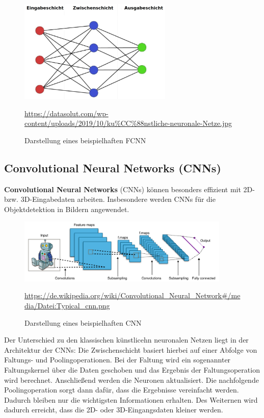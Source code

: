 	\begin{figure}[H]
		\centering
		\includegraphics[width=0.65\textwidth]{kapitel3/images/Simples_Neuronales_Netz.jpg}
		\caption{Darstellung eines beispielhaften FCNN}
		\vspace{0.2cm}
		\quelle\url{https://datasolut.com/wp-content/uploads/2019/10/ku%CC%88nstliche-neuronale-Netze.jpg}
	\end{figure}

\subsection{Convolutional Neural Networks (CNNs)}

	\textbf{Convolutional Neural Networks} (CNNs) können besonders effizient mit 2D- bzw. 3D-Eingabedaten arbeiten. Insbesondere werden CNNs für die Objektdetektion in Bildern angewendet. \cite{datasolut4} \\
	
	\begin{figure}[H]
		\centering
		\includegraphics[width=0.9\textwidth]{kapitel3/images/cnn.png}
		\caption{Darstellung eines beispielhaften CNN}
		\vspace{0.2cm}
		\quelle\url{https://de.wikipedia.org/wiki/Convolutional_Neural_Network#/media/Datei:Typical_cnn.png}
	\end{figure}
	
	Der Unterschied zu den klassischen künstlicehn neuronalen Netzen liegt in der Architektur der CNNs: Die Zwischenschicht basiert hierbei auf einer Abfolge von Faltungs- und Poolingoperationen. Bei der Faltung wird ein sogenannter Faltungskernel über die Daten geschoben und das Ergebnis der Faltungsoperation wird berechnet. Anschließend werden die Neuronen aktualisiert. Die nachfolgende Poolingoperation sorgt dann dafür, dass die Ergebnisse vereinfacht werden. Dadurch bleiben nur die wichtigsten Informationen erhalten.	Des Weiternen wird dadurch erreicht, dass die 2D- oder 3D-Eingangsdaten kleiner werden. \cite{datasolut4} 

